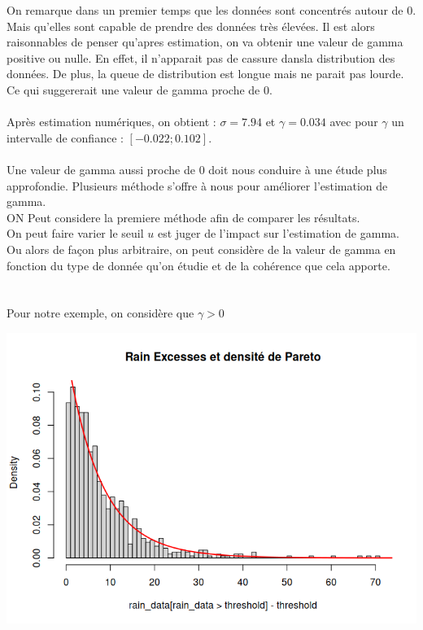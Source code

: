 \documentclass{article}
\begin{document}
On remarque dans un premier temps que les données sont concentrés autour de 0. Mais qu'elles sont capable de prendre des données très élevées.
Il est alors raisonnables de penser qu'apres estimation, on va obtenir une valeur de gamma positive ou nulle. En effet, il n'apparait pas de cassure dansla distribution des données.
De plus, la queue de distribution est longue mais ne parait pas lourde. Ce qui suggererait une valeur de gamma proche de 0.
\\
\\
Après estimation numériques, on obtient : $\sigma = 7.94$ et $\gamma = 0.034$ avec pour $\gamma$ un intervalle de confiance : $[-0.022 ; 0.102]$.
\\
\\ 
Une valeur de gamma aussi proche de 0 doit nous conduire à une étude plus approfondie.
Plusieurs méthode s'offre à nous pour améliorer l'estimation de gamma. 
\\
ON Peut considere la premiere méthode afin de comparer les résultats.
\\
On peut faire varier le seuil $u$ est juger de l'impact sur l'estimation de gamma.
\\
Ou alors de façon plus arbitraire, on peut considère de la valeur de gamma en fonction du type de donnée qu'on étudie et de la cohérence que cela apporte.
\\
\\
\\
Pour notre exemple, on considère que $\gamma > 0$

\begin{center}
	\includegraphics[scale=0.8]{./images/rainhistodensite.png} 
\end{center}
\end{document}
